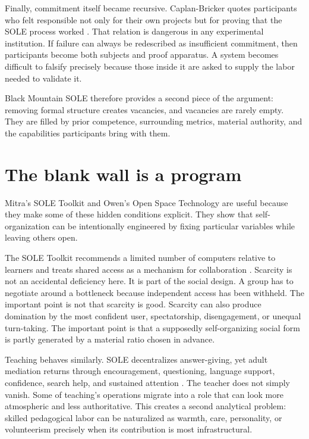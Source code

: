 \documentclass[11pt]{article}
\begin{document}
Finally, commitment itself became recursive. Caplan-Bricker quotes participants who felt responsible not only for their own projects but for proving that the SOLE process worked \cite{caplanbricker2013blackmountain}. That relation is dangerous in any experimental institution. If failure can always be redescribed as insufficient commitment, then participants become both subjects and proof apparatus. A system becomes difficult to falsify precisely because those inside it are asked to supply the labor needed to validate it.

Black Mountain SOLE therefore provides a second piece of the argument: removing formal structure creates vacancies, and vacancies are rarely empty. They are filled by prior competence, surrounding metrics, material authority, and the capabilities participants bring with them.

\section{The blank wall is a program}

Mitra's SOLE Toolkit and Owen's Open Space Technology are useful because they make some of these hidden conditions explicit. They show that self-organization can be intentionally engineered by fixing particular variables while leaving others open.

The SOLE Toolkit recommends a limited number of computers relative to learners and treats shared access as a mechanism for collaboration \cite{mitra_sole_toolkit}. Scarcity is not an accidental deficiency here. It is part of the social design. A group has to negotiate around a bottleneck because independent access has been withheld. The important point is not that scarcity is good. Scarcity can also produce domination by the most confident user, spectatorship, disengagement, or unequal turn-taking. The important point is that a supposedly self-organizing social form is partly generated by a material ratio chosen in advance.

Teaching behaves similarly. SOLE decentralizes answer-giving, yet adult mediation returns through encouragement, questioning, language support, confidence, search help, and sustained attention \cite{mitra_sole_toolkit}. The teacher does not simply vanish. Some of teaching's operations migrate into a role that can look more atmospheric and less authoritative. This creates a second analytical problem: skilled pedagogical labor can be naturalized as warmth, care, personality, or volunteerism precisely when its contribution is most infrastructural.
\end{document}
